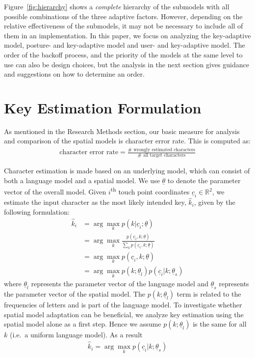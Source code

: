 \documentclass{sigchi}
\begin{document}
Figure~\ref{fig:hierarchy} shows a \textit{complete} hierarchy of the submodels with all
possible combinations of the three adaptive factors. However, depending on the
relative effectiveness of the submodels, it may not be necessary to include all of
them in an implementation. In this paper, we focus on analyzing the key-adaptive model, posture- and key-adaptive model and user- and key-adaptive model.
The order of the backoff process, and the priority of the models at the same level to use can
also be design choices, but the analysis in the next section gives
guidance and suggestions on how to determine an order.

\section{Key Estimation Formulation}\label{sec:formulation}
As mentioned in the Research Methods section, our basic measure for analysis and comparison of the spatial models is character error rate. This is computed as:
\begin{align}
\text{character error rate} = \frac{\text{# wrongly estimated characters}}{\text{# all target characters}}
\end{align}

Character estimation is made based on an underlying model, which can consist of
both a language model and a spatial model.
We use $\underline\theta$ to denote the parameter vector of the overall model. Given
$i$\textsuperscript{th} touch point coordinates $\underline c_i \in \mathbb{R}^2$, we estimate the input character as the most likely intended key, $\hat k_i$,  given by the following formulation:
\begin{align}
\hat k_i &= \arg\max_k p(k | \underline c_i; \underline \theta) \\
         &= \arg\max_k \frac{p(\underline c_i, k; \underline \theta)}{\sum_k p(\underline c_i, k; \underline \theta)} \\
         &= \arg\max_k p(\underline c_i, k; \underline \theta) \\
         &= \arg\max_k p(k;\underline\theta_l)p(\underline c_i | k; \underline \theta_s) \label{eq:likely-k}
\end{align}
where $\underline\theta_l$ represents the parameter vector of the language model and $\underline\theta_s$ represents the parameter vector of the spatial model. The $p(k;\underline\theta_l)$ term is related to the frequencies of letters and is part of the language model. To investigate whether spatial model adaptation can be beneficial, we analyze key estimation using the spatial model alone as a first step. Hence we assume $p(k; \underline\theta_l)$ is the same for all $k$ (i.e.\ a uniform language model). As a result
\begin{align}
\hat k_i = \arg\max_k p(\underline c_i | k; \underline \theta_s)
\end{align}
\end{document}
